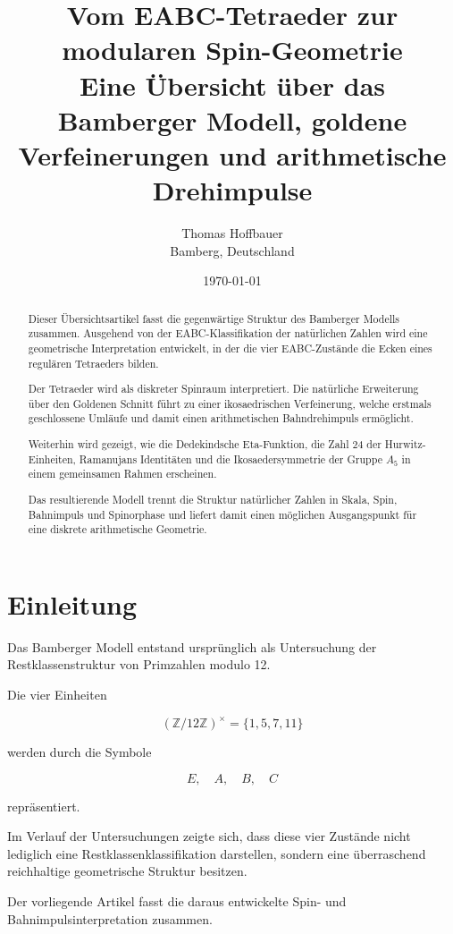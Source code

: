 \documentclass[11pt,a4paper]{article}
\title{
	Vom EABC-Tetraeder zur modularen Spin-Geometrie\\
	Eine Übersicht über das Bamberger Modell,
	goldene Verfeinerungen und arithmetische Drehimpulse
}
\author{
	Thomas Hoffbauer\\
	Bamberg, Deutschland
}
\date{\today}
\begin{document}
	
	\maketitle
	
	\begin{abstract}
		Dieser Übersichtsartikel fasst die gegenwärtige Struktur des Bamberger Modells zusammen.
		Ausgehend von der EABC-Klassifikation der natürlichen Zahlen wird eine geometrische
		Interpretation entwickelt, in der die vier EABC-Zustände die Ecken eines regulären
		Tetraeders bilden.
		
		Der Tetraeder wird als diskreter Spinraum interpretiert.
		Die natürliche Erweiterung über den Goldenen Schnitt führt zu einer ikosaedrischen
		Verfeinerung, welche erstmals geschlossene Umläufe und damit einen arithmetischen
		Bahndrehimpuls ermöglicht.
		
		Weiterhin wird gezeigt, wie die Dedekindsche Eta-Funktion,
		die Zahl 24 der Hurwitz-Einheiten, Ramanujans Identitäten
		und die Ikosaedersymmetrie der Gruppe $A_5$
		in einem gemeinsamen Rahmen erscheinen.
		
		Das resultierende Modell trennt die Struktur natürlicher Zahlen in
		Skala, Spin, Bahnimpuls und Spinorphase und liefert damit einen
		möglichen Ausgangspunkt für eine diskrete arithmetische Geometrie.
	\end{abstract}
	
	\tableofcontents
	
	\section{Einleitung}
	
	Das Bamberger Modell entstand ursprünglich als Untersuchung der
	Restklassenstruktur von Primzahlen modulo 12.
	
	Die vier Einheiten
	
	\[
	(\mathbb Z/12\mathbb Z)^\times
	=
	\{1,5,7,11\}
	\]
	
	werden durch die Symbole
	
	\[
	E,\quad A,\quad B,\quad C
	\]
	
	repräsentiert.
	
	Im Verlauf der Untersuchungen zeigte sich,
	dass diese vier Zustände nicht lediglich eine
	Restklassenklassifikation darstellen,
	sondern eine überraschend reichhaltige geometrische Struktur besitzen.
	
	Der vorliegende Artikel fasst die daraus entwickelte
	Spin- und Bahnimpulsinterpretation zusammen.
	
\end{document}
